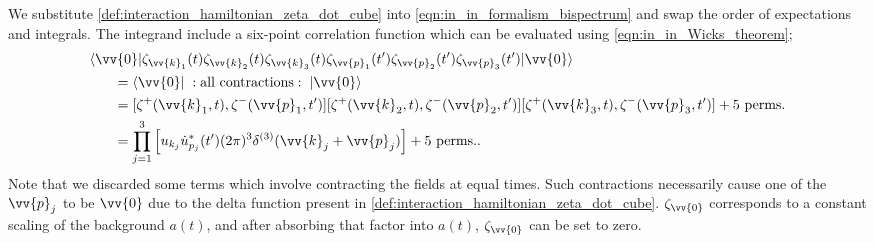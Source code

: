 \documentclass[a4paper,12pt,times,custombib,print,index]{Classes/PhDThesisPSnPDF} %
\begin{document}
We substitute \eqref{def:interaction_hamiltonian_zeta_dot_cube} into \eqref{eqn:in_in_formalism_bispectrum} and swap the order of expectations and integrals. The integrand include a six-point correlation function which can be evaluated using \eqref{eqn:in_in_Wicks_theorem};
\begin{align}
	&\langle\vv{0}| \zeta_{\vv{k}_1}(t) \zeta_{\vv{k}_2}(t) \zeta_{\vv{k}_3}(t) \zeta_{\vv{p}_1}(t') \zeta_{\vv{p}_2}(t') \zeta_{\vv{p}_3}(t') |\vv{0}\rangle \nonumber\\
	&\hspace{0.05\textwidth}= \langle\vv{0}| \;: \text{all contractions} :\;|\vv{0}\rangle \\
	&\hspace{0.05\textwidth}= [ \zeta^+(\vv{k}_1,t) , \zeta^-(\vv{p}_1,t') ] [ \zeta^+(\vv{k}_2,t) , \zeta^-(\vv{p}_2,t') ] [ \zeta^+(\vv{k}_3,t) , \zeta^-(\vv{p}_3,t') ] + \text{5 perms.}  \\
	&\hspace{0.05\textwidth}=  \prod_{j=1}^{3} \left[ u_{k_j} \dot{u}^*_{p_j}(t') (2\pi)^3 \delta^{(3)}(\vv{k}_j+\vv{p}_j) \right] + \text{5 perms.}.
\end{align}
Note that we discarded some terms which involve contracting the fields at equal times. Such contractions necessarily cause one of the $\vv{p}_j$ to be $\vv{0}$ due to the delta function present in \eqref{def:interaction_hamiltonian_zeta_dot_cube}. $\zeta_\vv{0}$ corresponds to a constant scaling of the background $a(t)$, and after absorbing that factor into $a(t)$, $\zeta_{\vv{0}}$ can be set to zero. 
\end{document}
